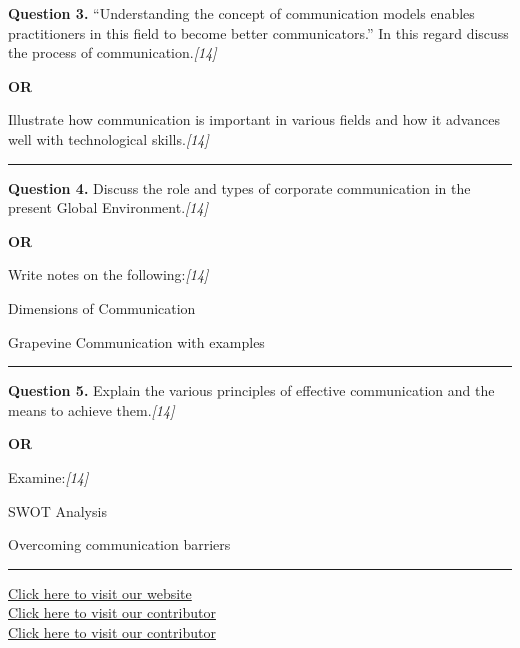 \documentclass[11pt,a4paper]{article}
\newcommand{\pts}[1]{\hfill   \textit{[#1]}}
\begin{document}
\noindent   \textbf{Question 3.}
``Understanding the concept of communication models enables practitioners in this field to become better communicators.'' In this regard discuss the process of communication.\pts{14}

\centerline{   \textbf{OR}}

Illustrate how communication is important in various fields and how it advances well with technological skills.\pts{14}

\medskip\rule{\linewidth}{0.2pt}




\noindent   \textbf{Question 4.}
Discuss the role and types of corporate communication in the present Global Environment.\pts{14}

\centerline{   \textbf{OR}}

Write notes on the following:\pts{14}

\begin{parts}
  \item Dimensions of Communication
  \item Grapevine Communication with examples
\end{parts}

\medskip\rule{\linewidth}{0.2pt}




\noindent   \textbf{Question 5.}
Explain the various principles of effective communication and the means to achieve them.\pts{14}

\centerline{   \textbf{OR}}

Examine:\pts{14}

\begin{parts}
  \item SWOT Analysis
  \item Overcoming communication barriers
\end{parts}

\vfill
\rule{\linewidth}{0.4pt}

\begin{center}\small
\href{https://bhu-exam.vercel.app/}{Click here to visit our website}\\[4pt]
\href{https://me-aryan.vercel.app/}{Click here to visit our contributor}\\[4pt]
\href{https://quashan-me.vercel.app/}{Click here to visit our contributor}
\end{center}
\end{document}

